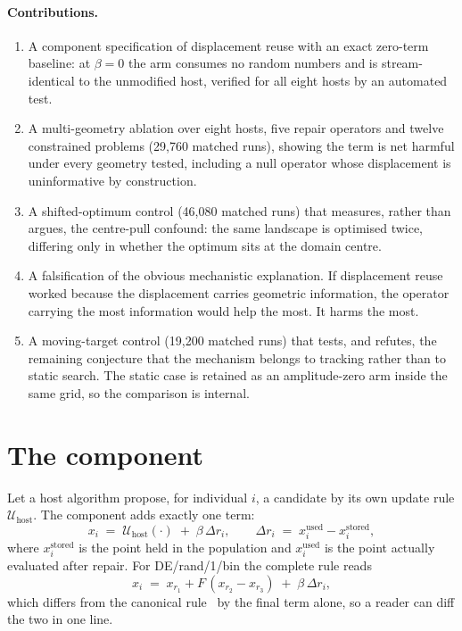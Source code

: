 \documentclass[11pt,a4paper]{article}
\begin{document}
\paragraph{Contributions.}
\begin{enumerate}
\item A component specification of displacement reuse with an exact zero-term baseline:
  at $\beta = 0$ the arm consumes no random numbers and is stream-identical to the
  unmodified host, verified for all eight hosts by an automated test.
\item A multi-geometry ablation over eight hosts, five repair operators and twelve
  constrained problems (29{,}760 matched runs), showing the term is net harmful under
  every geometry tested, including a null operator whose displacement is uninformative
  by construction.
\item A shifted-optimum control (46{,}080 matched runs) that measures, rather than
  argues, the centre-pull confound: the same landscape is optimised twice, differing only
  in whether the optimum sits at the domain centre.
\item A falsification of the obvious mechanistic explanation. If displacement reuse
  worked because the displacement carries geometric information, the operator carrying
  the most information would help the most. It harms the most.
\item A moving-target control (19{,}200 matched runs) that tests, and refutes, the
  remaining conjecture that the mechanism belongs to tracking rather than to static
  search. The static case is retained as an amplitude-zero arm inside the same grid, so
  the comparison is internal.
\end{enumerate}

\section{The component}

Let a host algorithm propose, for individual $i$, a candidate by its own update rule
$\mathcal{U}_{\text{host}}$. The component adds exactly one term:
\begin{equation}
  x_i \;=\; \mathcal{U}_{\text{host}}(\cdot) \;+\; \beta\,\Delta r_i ,
  \qquad
  \Delta r_i \;=\; x^{\text{used}}_i - x^{\text{stored}}_i ,
  \label{eq:component}
\end{equation}
where $x^{\text{stored}}_i$ is the point held in the population and $x^{\text{used}}_i$ is
the point actually evaluated after repair. For DE/rand/1/bin the complete rule reads
\begin{equation}
  x_i \;=\; x_{r_1} + F\,(x_{r_2} - x_{r_3}) \;+\; \beta\,\Delta r_i ,
\end{equation}
which differs from the canonical rule~\citep{storn1997} by the final term alone, so a
reader can diff the two in one line.
\end{document}
